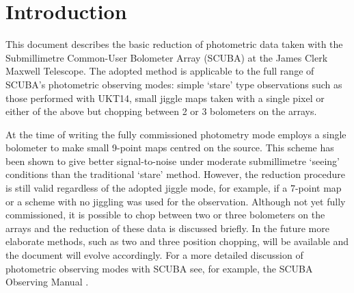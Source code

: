 \documentclass[twoside,11pt,fleqn]{article}
\newcommand{\stardocinitials}  {SC}
\newcommand{\stardocnumber}    {10.1}
\newcommand{\stardocabstract}  {[Text of abstract]}
\newcommand{\stardocname}{\stardocinitials /\stardocnumber}
\newcommand{\htmladdnormallink}[2]{#1}
\newenvironment{latexonly}{}{}
\newcommand{\latexonlytoc}[0]{\tableofcontents}
\renewcommand{\thepage}{\roman{page}}
\begin{document}
 \newpage
 \begin{latexonly}
   \setlength{\parskip}{0mm}
   \latexonlytoc
   \setlength{\parskip}{\medskipamount}
   \markboth{\stardocname}{\stardocname}
 \end{latexonly}
\cleardoublepage
\renewcommand{\thepage}{\arabic{page}}
\setcounter{page}{1}

\section{Introduction}

This document describes the basic reduction of photometric data taken with the
Submillimetre Common-User Bolometer Array (SCUBA) at the
\htmladdnormallink{James Clerk Maxwell
Telescope}{http://www.jach.hawaii.edu/JCMT/}. The adopted method is applicable
to the full range of SCUBA's photometric observing modes: simple `stare' type
observations such as those performed with UKT14, small jiggle maps taken with
a single pixel or either of the above but chopping between 2 or 3 bolometers
on the arrays.

At the time of writing the fully commissioned photometry mode employs
a single bolometer to make small 9-point maps centred on the
source. This scheme has been shown to give better signal-to-noise
under moderate submillimetre `seeing' conditions than the traditional
`stare' method.  However, the reduction procedure is still valid
regardless of the adopted jiggle mode, for example, if a 7-point map
or a scheme with no jiggling was used for the observation.  Although
not yet fully commissioned, it is possible to chop between two or
three bolometers on the arrays and the reduction of these data is
discussed briefly.  In the future more elaborate methods, such as two
and three position chopping, will be available and the document will
evolve accordingly.  For a more detailed discussion of photometric
observing modes with SCUBA see, for example, the
\htmladdnormallink{SCUBA Observing
Manual}{http://www.jach.hawaii.edu/jcmt_sw/scuba/}
\cite{obsguide}.
\end{document}

